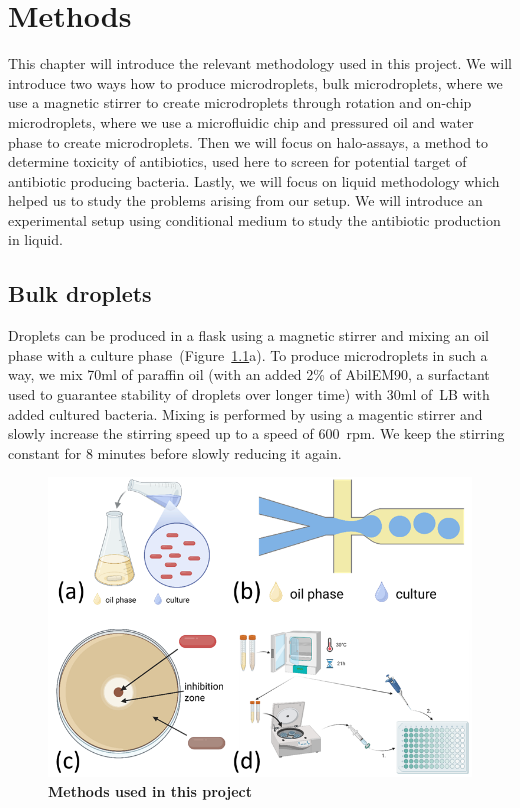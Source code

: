 \chapter{Methods}

This chapter will introduce the relevant methodology used in this project. We will introduce two ways how to produce microdroplets, bulk microdroplets, where we use a magnetic stirrer to create microdroplets through rotation and on-chip microdroplets, where we use a microfluidic chip and pressured oil and water phase to create microdroplets. Then we will focus on halo-assays, a method to determine toxicity of antibiotics, used here to screen for potential target of antibiotic producing bacteria. Lastly, we will focus on liquid methodology which helped us to study the problems arising from our setup. We will introduce an experimental setup using conditional medium to study the antibiotic production in liquid.

\section{Bulk droplets}
Droplets can be produced in a flask using a magnetic stirrer and mixing an oil phase with a culture phase~(Figure~\ref{fig:method_droplet_experiments}a). To produce microdroplets in such a way, we mix 70ml of paraffin oil (with an added 2\% of AbilEM90, a surfactant used to guarantee stability of droplets over longer time) with 30ml of~\gls{LB} with added cultured bacteria. Mixing is performed by using a magentic stirrer and slowly increase the stirring speed up to a speed of 600~\gls{rpm}. We keep the stirring constant for 8 minutes before slowly reducing it again. 

\begin{figure}
\centering
\includegraphics[width=\linewidth]{graphics/2025_09_28_droplets_fig2.png}
\caption{\textbf{Methods used in this project} }
\label{fig:method_droplet_experiments}
\end{figure}

